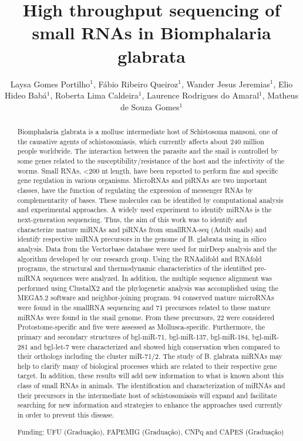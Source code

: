 \documentclass[twoside]{article}
\title{\vspace{-15mm}\fontsize{24pt}{10pt}\selectfont\textbf{High throughput sequencing of small RNAs in Biomphalaria glabrata}} %
\author{Laysa Gomes Portilho$^1$, F\'abio Ribeiro Queiroz$^1$, Wander Jesus Jeremias$^1$, Elio Hideo Bab\'a$^1$, Roberta Lima Caldeira$^1$, Laurence Rodrigues do Amaral$^1$, Matheus de Souza Gomes$^1$}
\affil{1 UFU\\ }
\date{}
\begin{document}
\maketitle %

\thispagestyle{fancy} %


\begin{abstract}
Biomphalaria glabrata is a mollusc intermediate host of Schistosoma mansoni, one of the causative agents of schistosomiasis, which currently affects about 240 million people worldwide. The interaction between the parasite and the snail is controlled by some genes related to the susceptibility/resistance of the host and the infectivity of the worms. Small RNAs, <200 nt length, have been reported to perform fine and specific gene regulation in various organisms. MicroRNAs and piRNAs are two important classes, have the function of regulating the expression of messenger RNAs by complementarity of bases. These molecules can be identified by computational analysis and experimental approaches. A widely used experiment to identify miRNAs is the next-generation sequencing. Thus, the aim of this work was to identify and characterize mature miRNAs and piRNAs from smallRNA-seq (Adult snails) and identify respective miRNA precursors in the genome of B. glabrata using in silico analysis. Data from the Vectorbase database were used for mirDeep analysis and the algorithm developed by our research group. Using the RNAalifold and RNAfold programs, the structural and thermodynamic characteristics of the identified pre-miRNA sequences were analyzed. In addition, the multiple sequence alignment was performed using ClustalX2 and the phylogenetic analysis was accomplished using the MEGA5.2 software and neighbor-joining program. 94 conserved mature microRNAs were found in the smallRNA sequencing and 71 precursors related to these mature miRNAs were found in the snail genome. From these precursors, 22 were considered Protostome-specific and five were assessed as Mollusca-specific. Furthermore, the primary and secondary structures of bgl-miR-71, bgl-miR-137, bgl-miR-184, bgl-miR-281 and bgl-let-7 were characterized and showed high conservation when compared to their orthologs including the cluster miR-71/2. The study of B. glabrata miRNAs may help to clarify many of biological processes which are related to their respective gene target. In addition, these results will add new information to what is known about this class of small RNAs in animals. The identification and characterization of miRNAs and their precursors in the intermediate host of schistosomiasis will expand and facilitate searching for new information and strategies to enhance the approaches used currently in order to prevent this disease.

Funding: UFU (Gradua\c{c}\~ao), FAPEMIG (Gradua\c{c}\~ao), CNPq and CAPES (Gradua\c{c}\~ao)
\end{abstract}
\end{document}
